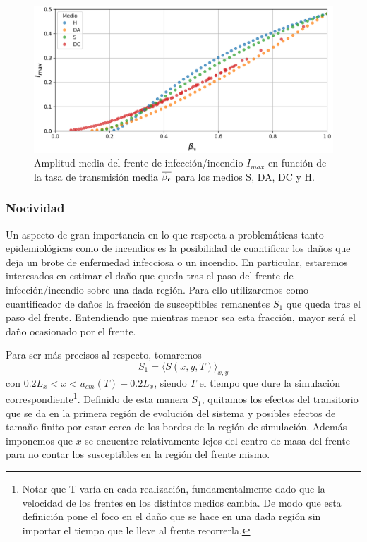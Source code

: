 \begin{figure}[h]
    \centering
    \includegraphics[width=\imsizeL]{I_max.png}
    \caption[Amplitud máxima en función de $\beta_m$ para los medios H, DA, S y DC]{Amplitud media del frente de infección/incendio $I_{max}$ en función de la tasa de transmisión media $\overline{\beta_{\vb r}}$ para los medios S, DA, 
    DC y H.}
    \label{fig:I_all}
\end{figure}


\newpage
\subsubsection*{Nocividad}

Un aspecto de gran importancia en lo que respecta a problemáticas tanto epidemiológicas como de incendios es la posibilidad de cuantificar los daños que
deja un brote de enfermedad infecciosa o un incendio. En particular, estaremos interesados en estimar el daño que queda tras el paso del frente de infección/incendio sobre una dada región. Para ello utilizaremos como cuantificador de daños la fracción de susceptibles remanentes $S_1$ que queda tras el paso del frente. Entendiendo que mientras menor sea esta fracción, mayor será el daño ocasionado por el frente.

Para ser más precisos al respecto, tomaremos 
\begin{equation}
    S_1=\langle S(x,y,T)\rangle_{x,y} \label{S1}  
\end{equation}
con $0.2L_x<x<u_{cm}(T)-0.2L_x$, siendo $T$ el tiempo que dure la simulación correspondiente\footnote{Notar que T varía en cada realización, fundamentalmente dado que la velocidad de los frentes en los distintos medios cambia. De modo que esta definición pone el foco en el daño que se hace en una dada región sin importar el tiempo que le lleve al frente recorrerla.}. Definido de esta manera $S_1$, quitamos los efectos del transitorio que se da en la primera región de evolución del sistema y posibles efectos de tamaño finito por estar cerca de los bordes de la región de simulación. Además imponemos que $x$ se encuentre relativamente lejos del centro de masa del frente para no contar los susceptibles en la región del frente mismo.

